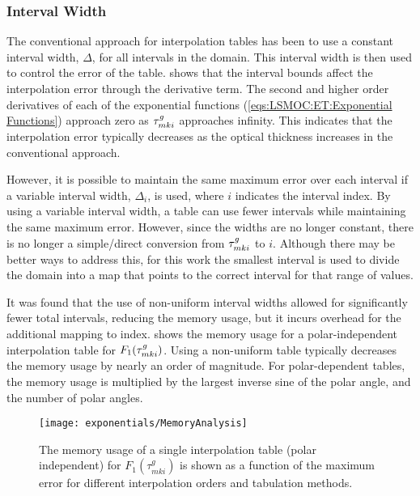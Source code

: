 {{{      \subsubsection{Interval Width}{\label{sssec:LSMOC:ET:Interval Width}
        The conventional approach for interpolation tables has been to use a constant interval width, $\Delta$, for all intervals in the domain.
        This interval width is then used to control the error of the table.
         shows that the interval bounds affect the interpolation error through the derivative term.
        The second and higher order derivatives of each of the exponential functions (\cref{eqs:LSMOC:ET:Exponential Functions}) approach zero as $\segopt$ approaches infinity.
        This indicates that the interpolation error typically decreases as the optical thickness increases in the conventional approach.

        However, it is possible to maintain the same maximum error over each interval if a variable interval width, $\Delta_i$, is used, where $i$ indicates the interval index.
        By using a variable interval width, a table can use fewer intervals while maintaining the same maximum error.
        However, since the widths are no longer constant, there is no longer a simple/direct conversion from $\segopt$ to $i$.
        Although there may be better ways to address this, for this work the smallest interval is used to divide the domain into a map that points to the correct interval for that range of values.

        It was found that the use of non-uniform interval widths allowed for significantly fewer total intervals, reducing the memory usage, but it incurs overhead for the additional mapping to index.
         shows the memory usage for a polar-independent interpolation table for $F_1(\segopt)$.
        Using a non-uniform table typically decreases the memory usage by nearly an order of magnitude.
        For polar-dependent tables, the memory usage is multiplied by the largest inverse sine of the polar angle, and the number of polar angles.

        \begin{figure}
          \centering
          \texttt{[image: exponentials/MemoryAnalysis]}
          \caption{The memory usage of a single interpolation table (polar independent) for $F_1(\tau^g_{mki})$ is shown as a function of the maximum error for different interpolation orders and tabulation methods.\label{fig:LSMOC:ET:Memory Analysis}}
        \end{figure}

}}}}
